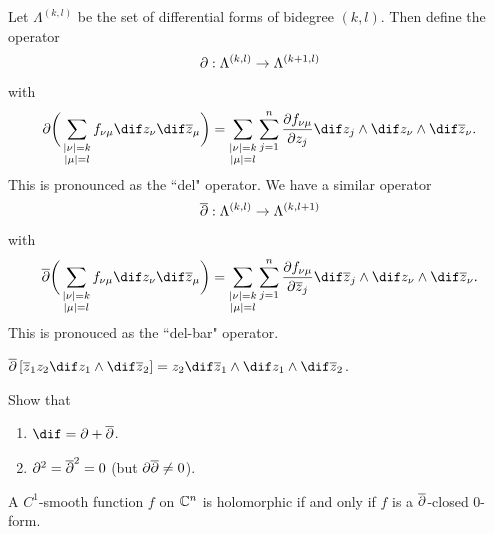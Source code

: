 \begin{definition}
    Let $\Lambda^{(k,l)}$ be the set of differential forms of bidegree $(k,l)$. Then define the operator
    \begin{align*}
        \partial : \Lambda^{(k,l)} \to \Lambda^{(k+1,l)}
    \end{align*}
    with
    \begin{align*}
        \difp  \bigg( \sum_{\substack{|\nu| = k \\ |\mu| = l} } f_{\nu \mu} \dif z_\nu \dif \zz_\mu \bigg) = \sum_{\substack{|\nu| = k \\ |\mu| = l}} \sum_{j=1}^n \frac{\difp f_{\nu \mu}}{\difp z_j} \dif z_j \wedge \dif z_\nu \wedge \dif \zz_\nu.
    \end{align*}
    This is pronounced as the ``del" operator. We have a similar operator
    \begin{align*}
        \overline{\partial} : \Lambda^{(k,l)} \to \Lambda^{(k,l+1)}
    \end{align*}
    with
    \begin{align*}
        \difpo  \bigg( \sum_{\substack{|\nu| = k \\ |\mu| = l} } f_{\nu \mu} \dif z_\nu \dif \zz_\mu \bigg) = \sum_{\substack{|\nu| = k \\ |\mu| = l}} \sum_{j=1}^n \frac{\difp f_{\nu \mu}}{\difp \zz_j} \dif \zz_j \wedge \dif z_\nu \wedge \dif \zz_\nu.
    \end{align*}
    This is pronouced as the ``del-bar" operator.
\end{definition}

\begin{example}
    $\difpo \left[ \zz_1  z_2 \dif z_1 \wedge \dif \zz_2 \right] = z_2 \dif \zz_1 \wedge \dif z_1 \wedge \dif \zz_2$.
\end{example}

\begin{exercise}
    Show that
    \begin{enumerate}
        \item $\dif = \difp + \difpo$.
        \item $\partial^2 = \overline{\partial}^2 = 0$ (but $\partial \overline{\partial} \neq 0$).
    \end{enumerate}
\end{exercise}

\begin{remark}
    A $C^1$-smooth function $f$ on $\mathbb{C}^n$ is holomorphic if and only if $f$ is a $\overline{\partial}$-closed $0$-form.
\end{remark}

